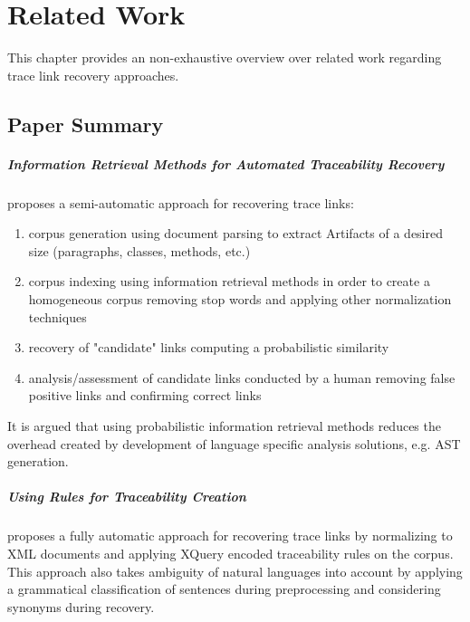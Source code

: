 \chapter{Related Work}
\label{chapter:RelatedWork}
This chapter provides an non-exhaustive overview over related work regarding trace link recovery approaches.

%
%
%

\section{Paper Summary}

\paragraph*{Information Retrieval Methods for Automated Traceability Recovery}
\cite{DeLucia2012} 
proposes a semi-automatic approach for recovering trace links:
\begin{enumerate}
\item
corpus generation using document parsing to extract \glspl{Artifact} of a desired size (paragraphs, classes, methods, etc.)
\item
corpus indexing using information retrieval methods in order to create a homogeneous corpus removing stop words and applying other normalization techniques
\item
recovery of "candidate" links computing a probabilistic similarity
\item
analysis/assessment of candidate links conducted by a human removing false positive links and confirming correct links
\end{enumerate}
It is argued that using probabilistic information retrieval methods reduces the  overhead created by development of language specific analysis solutions, e.g. \gls{AST} generation.


\paragraph*{Using Rules for Traceability Creation} 
\cite{Zisman2012}
proposes a fully automatic approach for recovering trace links by normalizing to \gls{XML} documents and applying XQuery encoded traceability rules on the corpus.
This approach also takes ambiguity of natural languages into account by applying a grammatical classification of sentences during preprocessing and considering synonyms during recovery.

